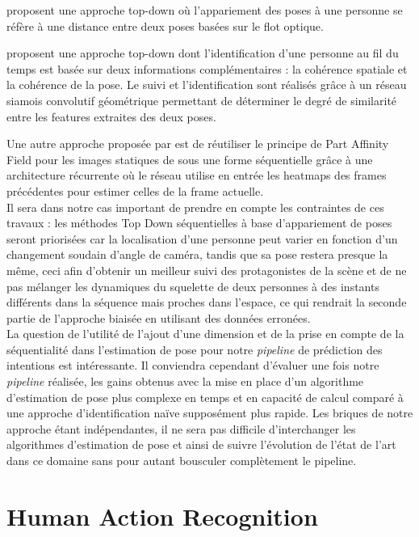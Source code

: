 \cite{2019arXiv190502822N} proposent une approche top-down où l'appariement des poses à une personne se réfère à une distance entre deux poses basées sur le flot optique.

\cite{2018arXiv180406208X} proposent une approche top-down dont l'identification d'une personne au fil du temps est basée sur deux informations complémentaires : la cohérence spatiale et la cohérence de la pose. Le suivi et l'identification sont réalisés grâce à un réseau siamois convolutif géométrique permettant de déterminer le degré de similarité entre les features extraites des deux poses.
 
Une autre approche proposée par \cite{Raaj_2019_CVPR} est de réutiliser le principe de Part Affinity Field pour les images statiques de \cite{cao2017realtime} sous une forme séquentielle grâce à une architecture récurrente où le réseau utilise en entrée les heatmaps des frames précédentes pour estimer celles de la frame actuelle.\\

Il sera dans notre cas important de prendre en compte les contraintes de ces travaux : les méthodes Top Down séquentielles à base d'appariement de poses seront priorisées car la localisation d'une personne peut varier en fonction d'un changement soudain d'angle de caméra, tandis que sa pose restera presque la même, ceci afin d'obtenir un meilleur suivi des protagonistes de la scène et de ne pas mélanger les dynamiques du squelette de deux personnes à des instants différents dans la séquence mais proches dans l'espace, ce qui rendrait la seconde partie de l'approche biaisée en utilisant des données erronées.\\

La question de l'utilité de l'ajout d'une dimension et de la prise en compte de la séquentialité dans l'estimation de pose pour notre \textit{pipeline} de prédiction des intentions est intéressante. Il conviendra cependant d'évaluer une fois notre \textit{pipeline} réalisée, les gains obtenus avec la mise en place d'un algorithme d'estimation de pose plus complexe en temps et en capacité de calcul comparé à une approche d'identification naïve supposément plus rapide. Les briques de notre approche étant indépendantes, il ne sera pas difficile d'interchanger les algorithmes d'estimation de pose et ainsi de suivre l'évolution de l'état de l'art dans ce domaine sans pour autant bousculer complètement le pipeline. 


\chapter{Human Action Recognition}
\label{ch:chapter2}

